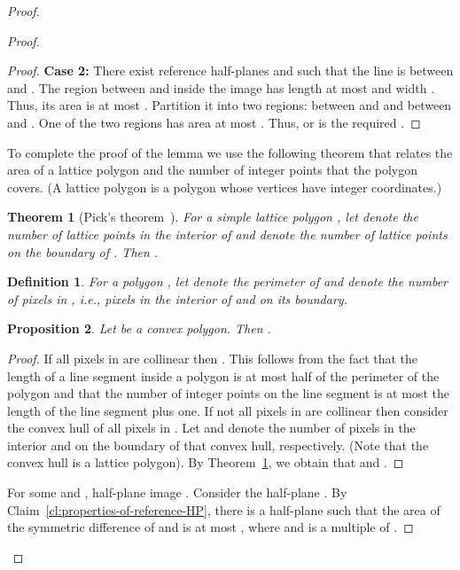\documentclass[11pt,english]{article}
\newtheorem{theorem}{Theorem}[section]
\newtheorem{proposition}[theorem]{Proposition}
\newtheorem{definition}{Definition}[section]
\numberwithin{figure}{section}
\begin{document}
\begin{proof}
{\begin{proof}
\begin{proof}
{\bf Case 2:} There exist reference half-planes  and  such that the line 
 is between  and . The region between  and  inside the image has
length at most  and width . Thus, its area is at
most . Partition it into two regions: between  and
 and between  and . One of the two regions has area at most
. Thus,  or  is the required .
\end{proof}

To complete the proof of the lemma we use the following theorem that relates the area of a lattice polygon and the number of integer points that the polygon covers. (A lattice polygon is a polygon whose vertices have integer coordinates.)
\begin{theorem}[Pick's theorem~\cite{pick}]\label{thm:pick}
For a simple lattice polygon , let  denote the number of lattice points in the interior of  and  denote the number of lattice points on the boundary of . Then .
\end{theorem}

\begin{definition}
For a polygon , let  denote the perimeter of  and  denote the number of pixels in , i.e., pixels in the interior of  and on its boundary.
\end{definition}
\begin{proposition}\label{prop:area-pixel}
Let  be a convex polygon. Then .
\end{proposition}
\begin{proof}
If all pixels in  are collinear then . This follows from the fact that the length of a line segment inside a polygon is at most half of the perimeter of the polygon and that the number of integer points on the line segment is at most the length of the line segment plus one. If not all pixels in  are collinear then consider the convex hull of all pixels in . Let  and  denote the number of pixels in the interior and on the boundary of that convex hull, respectively. (Note that the convex hull is a lattice polygon). By Theorem~\ref{thm:pick}, we obtain that  and .
\end{proof}


For some  and , half-plane image . Consider the half-plane . By Claim~\ref{cl:properties-of-reference-HP}, there is a half-plane  such that the area of the symmetric difference of  and  is at most , where  and  is  a multiple of . 


\end{proof}}
\end{proof}
\end{document}
